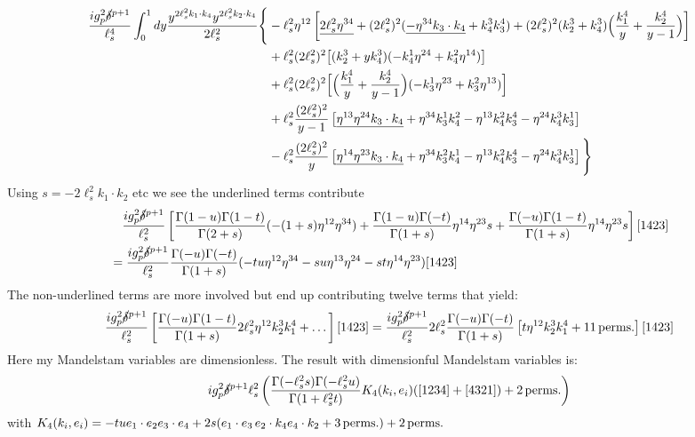\documentclass[11pt, class=article, crop=false]{standalone}
\begin{document}
\begin{enumerate}
	\begin{equation}\label{eq:gauge}
	\begin{aligned}
		\frac{i g_p^2 \cancel\delta^{p+1}}{\ell_s^4} \int_0^1 dy \frac{y^{2 \ell_s^2 k_1 \cdot k_4} y^{2 \ell_s^2 k_2 \cdot k_4}}{2 \ell_s^2}
		 \Bigg\{
		& -\ell_s^2 \eta^{12} 
		 \left[ \underline{2 \ell_s^2 \eta^{34}} + (2 \ell_s^2)^2 (\underline{-\eta^{34} k_3 \cdot k_4} + k_4^3 k_3^4) + (2\ell_s^2)^2 (k_2^3 + k_4^3) \Big(\frac{k_1^4}{y} + \frac{k_2^4}{y-1}\Big) \right]\\
		& + \ell_s^2 (2 \ell_s^2)^2 
		\big[(k_2^3 + y k_4^3)(-k_4^1 \eta^{24} + k_4^2 \eta^{14}) \big] 
		\\ & + \ell_s^2 (2 \ell_s^2)^2 
		\Big[\Big(\frac{k_1^4}{y} + \frac{k_2^4}{y-1} \Big) (-k_3^1 \eta^{23} + k_3^2 \eta^{13}) \Big]\\
		& + \ell_s^2 \frac{(2 \ell_s^2)^2}{y-1} 
		\left[\underline{\eta^{13} \eta^{24} k_3 \cdot k_4} + \eta^{34} k_3^1 k_4^2 - \eta^{13} k_4^2 k_3^4 - \eta^{24} k_4^3 k_3^1 \right]\\
		& - \ell_s^2 \frac{(2 \ell_s^2)^2}{y} 
		\left[\underline{\eta^{14} \eta^{23} k_3 \cdot k_4 }+ \eta^{34} k_3^2 k_4^1 - \eta^{13} k_4^2 k_3^4 - \eta^{24} k_4^3 k_3^1 \right]  \Bigg\}
	\end{aligned}		
	\end{equation}
	Using $s = -2 \ell_s^2 k_1 \cdot k_2$ etc we see the underlined terms contribute
	\[
	\begin{aligned}
		& \quad \frac{i g_p^2 \cancel\delta^{p+1}}{\ell_s^2} \left[\frac{\Gamma(1-u) \Gamma(1-t)}{\Gamma(2+s)} (-(1 + s) \eta^{12} \eta^{34}) + \frac{\Gamma(1-u) \Gamma(-t)}{\Gamma(1+s)} \eta^{14} \eta^{23} s + \frac{\Gamma(-u) \Gamma(1-t)}{\Gamma(1+s)} \eta^{14} \eta^{23} s \right][1423]\\
		& = \frac{i g_p^2 \cancel\delta^{p+1}}{\ell_s^2} \frac{\Gamma(-u) \Gamma(-t)}{\Gamma(1+s)} ( - tu \eta^{12} \eta^{34} - su \eta^{13} \eta^{24} - st \eta^{14} \eta^{23} ) [1423]
	\end{aligned}
	\]
	The non-underlined terms are more involved but end up contributing twelve terms that yield:
	\[
	\begin{aligned}
		& \quad \frac{i g_p^2 \cancel\delta^{p+1}}{\ell_s^2} \left[\frac{\Gamma(-u) \Gamma(1-t)}{\Gamma(1+s)} 2 \ell_s^2 \eta^{12} k_2^3 k_1^4 + \dots \right][1423] = \frac{i g_p^2 \cancel\delta^{p+1}}{\ell_s^2} 2 \ell_s^2 \frac{\Gamma(-u) \Gamma(-t)}{\Gamma(1+s)} \left[ t \eta^{12} k_2^3 k_1^4 + 11 \,\mathrm{perms.} \right][1423]
	\end{aligned}
	\]
	Here my Mandelstam variables are dimensionless. The result with dimensionful Mandelstam variables is:
	\begin{equation}\label{eq:4gluons}
		i g_p^2 \cancel\delta^{p+1} \ell_s^2  \left( \frac{\Gamma(-\ell_s^2 s) \Gamma( -\ell_s^2 u)}{\Gamma(1 + \ell_s^2 t)} K_4(k_i, e_i) ([1234] + [4321]) + 2 \,\mathrm{perms.}\right)
	\end{equation}
	with $K_4 (k_i, e_i) = - t u e_1 \cdot e_2 e_3 \cdot e_4 + 2 s (e_1 \cdot e_3 \, e_2 \cdot k_4 e_4 \cdot k_2 + 3 \,\mathrm{perms.} )  + 2 \,\mathrm{perms.}$
	

\end{enumerate}
\end{document}
